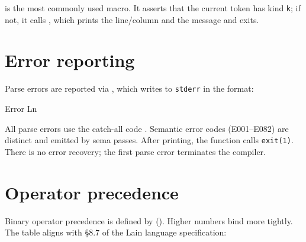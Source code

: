 \pnum
{} is the most commonly used macro.  It asserts that
the current token has kind \texttt{k}; if not, it calls ,
which prints the line/column and the message and exits.

\section{Error reporting}
\label{sec:par-errors}

\pnum
Parse errors are reported via , which
writes to \texttt{stderr} in the format:

\begin{ccode}
[E100] Error Ln %
\end{ccode}

\pnum
All parse errors use the catch-all code .  Semantic error codes
(E001--E082) are distinct and emitted by sema passes.  After printing, the
function calls \texttt{exit(1)}.  There is no error recovery; the first parse
error terminates the compiler.

\section{Operator precedence}
\label{sec:par-precedence}

\pnum
Binary operator precedence is defined by 
().  Higher numbers bind more tightly.  The table
aligns with §8.7 of the Lain language specification:

